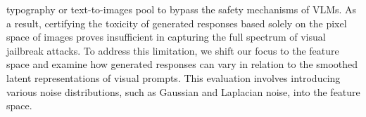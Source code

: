 typography or text-to-images pool to bypass the safety mechanisms of VLMs. As a result, certifying the toxicity of generated responses based solely on the pixel space of images proves insufficient in capturing the full spectrum of visual jailbreak attacks. To address this limitation, we shift our focus to the feature space and examine how generated responses can vary in relation to the smoothed latent representations of visual prompts. This evaluation involves introducing various noise distributions, such as Gaussian and Laplacian noise, into the feature space. 


